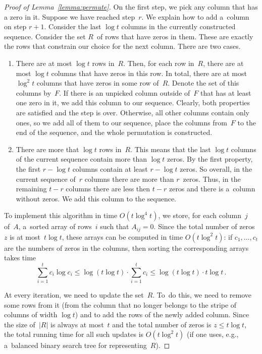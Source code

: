 \begin{proof}[Proof of Lemma~\ref{lemma:permute}]
On the first step, we pick any column that has a zero in it. Suppose
we have reached step~$r$. We explain how to add a~column on
step $r+1$. Consider the last $\log t$ columns in the currently
constructed sequence. Consider the set $R$~of rows that have
zeros in them. These are exactly the rows that constrain our
choice for the next column. There are two cases.
\begin{enumerate}
\item There are at most $\log t$ rows in~$R$. Then, for each row in~$R$, there
are at most $\log t$ columns that have zeros in this row. In total, there are at
most $\log^2 t$ columns that have zeros in some row of~$R$. Denote the set of
this columns by~$F$. If there is an unpicked column outside of~$F$ that has at
least one zero in it, we add this column to our sequence. Clearly, both
properties are satisfied and the step is over. Otherwise, all other columns
contain only ones, so we add all of them to our sequence, place the columns
from~$F$ to the end of the sequence, and the whole permutation is constructed.
\item There are more that $\log t$ rows in~$R$. This means that the last
$\log t$ columns of the current sequence contain more than $\log t$ zeros. By
the first property, the first $r - \log t$ columns contain at least $r - \log t$
zeros. So overall, in the current sequence of~$r$ columns there are more than
$r$~zeros. Thus, in the remaining $t-r$ columns there are less then $t-r$ zeros
and there is a~column without zeros. We add this column to the sequence.
\end{enumerate}


To implement this algorithm in time $O(t\log^{4}t)$, we store, for each
column~$j$ of~$A$, a~sorted array of rows~$i$ such that $A_{ij}=0$. Since the
total number of zeros~$z$ is at most~$t\log t$, these arrays can be computed in
time $O(t\log^2t)$: if $c_1, \dotsc, c_t$ are the numbers of zeros in the
columns, then sorting the corresponding arrays takes time
\[\sum_{i=1}^{t}c_i \log c_i \le \log(t \log t) \cdot \sum_{i=1}^{t}c_i \le \log(t \log t) \cdot t\log t \, .\]

At every iteration, we need to update the set~$R$. To~do this, we need to remove
some rows from it (from the column that no longer belongs to the stripe of
columns of width $\log t$) and to add the rows of the newly added column. Since
the size of~$|R|$ is always at most~$t$ and the total number of zeros is
$z \le t\log t$, the total running time for all such updates is
$O(t\log^2t)$ (if one uses, e.g., a~balanced binary search tree for
representing~$R$).


\end{proof}
